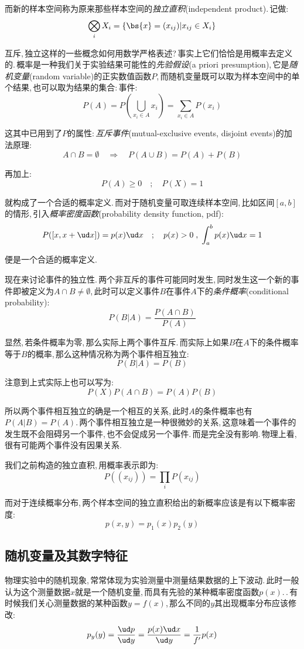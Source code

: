 而新的样本空间称为原来那些样本空间的\emph{独立直积}(independent product).\,记做:
\[\bigotimes_i X_i=\{\bs{x}=(x_{ij})|x_{ij}\in X_i\}\]

互斥,\,独立这样的一些概念如何用数学严格表述?\,事实上它们恰恰是用概率去定义的.\,概率是一种我们关于实验结果可能性的\emph{先验假设}(a priori presumption),\,它是\emph{随机变量}(random variable)的正实数值函数\(P\),\,而随机变量既可以取为样本空间中的单个结果,\,也可以取为结果的集合:\,事件:
\[P(A)=P(\bigcup_{x_i\in A} {x_i})=\sum_{x_i\in A} P(x_i)\]

这其中已用到了\(P\)的属性:\,\emph{互斥事件}(mutual-exclusive events, disjoint events)的加法原理:
\[A\cap B=\emptyset\quad \Rightarrow\quad P(A\cup B)=P(A)+P(B)\]

再加上:
\[P(A)\geqslant 0\quad ;\quad P(X)=1\]

就构成了一个合适的概率定义.\,而对于随机变量可取连续样本空间,\,比如区间\([a,b]\)的情形,\,引入\emph{概率密度函数}(probability density function, pdf):
\[P([x,x+\ud x])=p(x)\ud x\quad ;\quad p(x)>0\;,\;\int_a^b p(x)\ud x=1\]

便是一个合适的概率定义.

现在来讨论事件的独立性.\,两个非互斥的事件可能同时发生,\,同时发生这一个新的事件即被定义为\(A\cap B\neq \emptyset\),\,此时可以定义事件\(B\)在事件\(A\)下的\emph{条件概率}(conditional probability):
\[P(B|A)=\frac{P(A\cap B)}{P(A)}\]

显然,\,若条件概率为零,\,那么实际上两个事件互斥.\,而实际上如果\(B\)在\(A\)下的条件概率等于\(B\)的概率,\,那么这种情况称为两个事件相互独立:
\[P(B|A)=P(B)\]

注意到上式实际上也可以写为:
\[P(X)P(A\cap B)=P(A)P(B)\]

所以两个事件相互独立的确是一个相互的关系,\,此时\(A\)的条件概率也有\(P(A|B)=P(A)\).\,两个事件相互独立是一种很微妙的关系,\,这意味着一个事件的发生既不会阻碍另一个事件,\,也不会促成另一个事件.\,而是完全没有影响.\,物理上看,\,很有可能两个事件没有因果关系.

我们之前构造的独立直积,\,用概率表示即为:
\[P((x_{ij}))=\prod_i P(x_{ij})\]

而对于连续概率分布,\,两个样本空间的独立直积给出的新概率应该是有以下概率密度:
\[p(x,y)=p_1(x)p_2(y)\]

\subsection{随机变量及其数字特征}
物理实验中的随机现象,\,常常体现为实验测量中测量结果数据的上下波动.\,此时一般认为这个测量数据\(x\)就是一个随机变量,\,而具有先验的某种概率密度函数\(p(x)\).\,.\,有时候我们关心测量数据的某种函数\(y=f(x)\),\,那么不同的\(y\)其出现概率分布应该修改:
\[p_y(y)=\frac{\ud p}{\ud y}=\frac{p(x)\ud x}{\ud y}=\frac{1}{f'}p(x)\]

